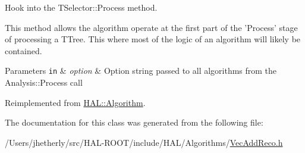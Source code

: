 Hook into the T\+Selector\+::\+Process method. 

This method allows the algorithm operate at the first part of the 'Process' stage of processing a T\+Tree. This where most of the logic of an algorithm will likely be contained. 
\begin{DoxyParams}[1]{Parameters}
\mbox{\tt in}  & {\em option} & Option string passed to all algorithms from the Analysis\+::\+Process call \\
\hline
\end{DoxyParams}


Reimplemented from \hyperlink{class_h_a_l_1_1_algorithm_a438c5c54698aa014b660474d08703bc2}{H\+A\+L\+::\+Algorithm}.



The documentation for this class was generated from the following file\+:\begin{DoxyCompactItemize}
\item 
/\+Users/jhetherly/src/\+H\+A\+L-\/\+R\+O\+O\+T/include/\+H\+A\+L/\+Algorithms/\hyperlink{_vec_add_reco_8h}{Vec\+Add\+Reco.\+h}\end{DoxyCompactItemize}
